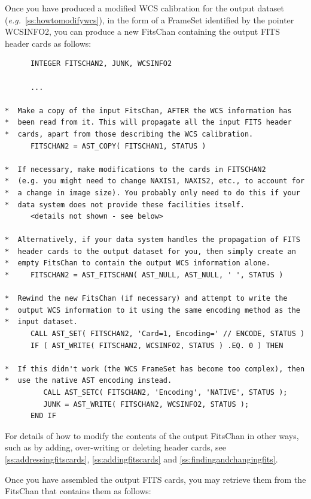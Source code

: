 \documentclass[twoside,11pt]{article}
\newcommand{\htmlref}[2]{#1}
\newcommand{\secref}[1]{\S\ref{#1}}
\renewcommand{\secref}[1]{\ref{#1}}
\begin{document}
Once you have produced a modified WCS calibration for the output
dataset ({\em{e.g.}}\ \secref{ss:howtomodifywcs}), in the form of a
\htmlref{FrameSet}{FrameSet} identified by the pointer WCSINFO2, you can produce a new
\htmlref{FitsChan}{FitsChan} containing the output FITS header cards as follows:

\small
\begin{verbatim}
      INTEGER FITSCHAN2, JUNK, WCSINFO2

      ...

*  Make a copy of the input FitsChan, AFTER the WCS information has
*  been read from it. This will propagate all the input FITS header
*  cards, apart from those describing the WCS calibration.
      FITSCHAN2 = AST_COPY( FITSCHAN1, STATUS )

*  If necessary, make modifications to the cards in FITSCHAN2
*  (e.g. you might need to change NAXIS1, NAXIS2, etc., to account for
*  a change in image size). You probably only need to do this if your
*  data system does not provide these facilities itself.
      <details not shown - see below>

*  Alternatively, if your data system handles the propagation of FITS
*  header cards to the output dataset for you, then simply create an
*  empty FitsChan to contain the output WCS information alone.
*     FITSCHAN2 = AST_FITSCHAN( AST_NULL, AST_NULL, ' ', STATUS )

*  Rewind the new FitsChan (if necessary) and attempt to write the
*  output WCS information to it using the same encoding method as the
*  input dataset.
      CALL AST_SET( FITSCHAN2, 'Card=1, Encoding=' // ENCODE, STATUS )
      IF ( AST_WRITE( FITSCHAN2, WCSINFO2, STATUS ) .EQ. 0 ) THEN

*  If this didn't work (the WCS FrameSet has become too complex), then
*  use the native AST encoding instead.
         CALL AST_SETC( FITSCHAN2, 'Encoding', 'NATIVE', STATUS );
         JUNK = AST_WRITE( FITSCHAN2, WCSINFO2, STATUS );
      END IF
\end{verbatim}
\normalsize

For details of how to modify the contents of the output FitsChan in
other ways, such as by adding, over-writing or deleting header cards,
see \secref{ss:addressingfitscards}, \secref{ss:addingfitscards} and
\secref{ss:findingandchangingfits}.

Once you have assembled the output FITS cards, you may retrieve them
from the FitsChan that contains them as follows:
\end{document}
